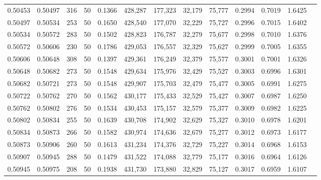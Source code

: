 \begin{tabular}{rrrrrrrrrrrrr}
0.50453 & 0.50497 &   316 &  50 &                                     0.1366 & 428,287 & 177,323 &  32,179 &  75,777 & 0.2994 & 0.7019 & 1.6425 \\
0.50497 & 0.50534 &   253 &  50 &                                     0.1650 & 428,540 & 177,070 &  32,229 &  75,727 & 0.2996 & 0.7015 & 1.6402 \\
0.50534 & 0.50572 &   283 &  50 &                                     0.1502 & 428,823 & 176,787 &  32,279 &  75,677 & 0.2998 & 0.7010 & 1.6376 \\
0.50572 & 0.50606 &   230 &  50 &                                     0.1786 & 429,053 & 176,557 &  32,329 &  75,627 & 0.2999 & 0.7005 & 1.6355 \\
0.50606 & 0.50648 &   308 &  50 &                                     0.1397 & 429,361 & 176,249 &  32,379 &  75,577 & 0.3001 & 0.7001 & 1.6326 \\
0.50648 & 0.50682 &   273 &  50 &                                     0.1548 & 429,634 & 175,976 &  32,429 &  75,527 & 0.3003 & 0.6996 & 1.6301 \\
0.50682 & 0.50721 &   273 &  50 &                                     0.1548 & 429,907 & 175,703 &  32,479 &  75,477 & 0.3005 & 0.6991 & 1.6275 \\
0.50722 & 0.50762 &   270 &  50 &                                     0.1562 & 430,177 & 175,433 &  32,529 &  75,427 & 0.3007 & 0.6987 & 1.6250 \\
0.50762 & 0.50802 &   276 &  50 &                                     0.1534 & 430,453 & 175,157 &  32,579 &  75,377 & 0.3009 & 0.6982 & 1.6225 \\
0.50802 & 0.50834 &   255 &  50 &                                     0.1639 & 430,708 & 174,902 &  32,629 &  75,327 & 0.3010 & 0.6978 & 1.6201 \\
0.50834 & 0.50873 &   266 &  50 &                                     0.1582 & 430,974 & 174,636 &  32,679 &  75,277 & 0.3012 & 0.6973 & 1.6177 \\
0.50873 & 0.50906 &   260 &  50 &                                     0.1613 & 431,234 & 174,376 &  32,729 &  75,227 & 0.3014 & 0.6968 & 1.6153 \\
0.50907 & 0.50945 &   288 &  50 &                                     0.1479 & 431,522 & 174,088 &  32,779 &  75,177 & 0.3016 & 0.6964 & 1.6126 \\
0.50945 & 0.50975 &   208 &  50 &                                     0.1938 & 431,730 & 173,880 &  32,829 &  75,127 & 0.3017 & 0.6959 & 1.6107 \\

\end{tabular}
